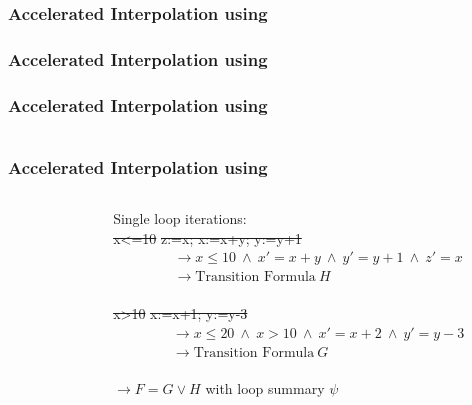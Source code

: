 \begin{frame}[t]
	\frametitle{Accelerated Interpolation using \qvasr}
	\resizebox{\textwidth}{!}{}
\end{frame}

\begin{frame}[t]
	\frametitle{Accelerated Interpolation using \qvasr}
	\resizebox{0.5\textwidth}{!}{}
\end{frame}

\begin{frame}[t]
	\frametitle{Accelerated Interpolation using \qvasr}
	\begin{columns}
		\begin{column}{0.35\textwidth}
			\resizebox{0.8\textwidth}{!}{}
		\end{column}
		\begin{column}{0.55\textwidth}
			\onslide<2-5>
			\resizebox{0.4\textwidth}{!}{}
		\end{column}
	\end{columns}
\end{frame}

\begin{frame}[t]
	\frametitle{Accelerated Interpolation using \qvasr}
	\begin{columns}
		\begin{column}{0.35\textwidth}
			\resizebox{0.8\textwidth}{!}{}
		\end{column}
		\begin{column}{0.55\textwidth}
			Single loop iterations: \vspace*{0.25cm}\\
			\st{x<=10} \st{z:=x; x:=x+y; y:=y+1}
			\onslide<2->
			{\small 
			\begin{align*}
			&\rightarrow x \leq 10\ \land\ x' = x + y\ \land\ y' = y + 1\ \land\ z' = x \\
			&\rightarrow \text{Transition Formula}\ H 
			\end{align*}
			}%
			\onslide<1-> \\
			\vspace*{1cm}\st{x>10} \st{x:=x+1; y:=y-3}
			\onslide<2->
			\begin{align*}
			&\rightarrow	x \leq 20\ \land\ x > 10\ \land\ x' = x + 2\ \land\ y' = y -3 \\
			&\rightarrow \text{Transition Formula}\ G
			\end{align*}
			\onslide<3-> \\
			\vspace*{1cm}
			$\rightarrow F = G \lor H$ \onslide<4-> with loop summary \color<4->{emblue} $\psi$
		\end{column}
	\end{columns}
\end{frame}

